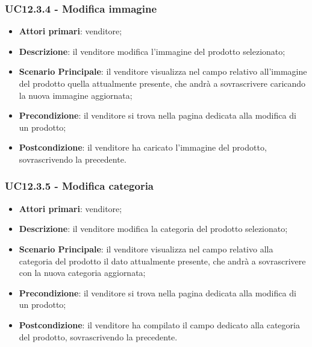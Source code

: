 \subsubsection{UC12.3.4 - Modifica immagine}
\begin{itemize}
\item \textbf{Attori primari}: venditore;
\item \textbf{Descrizione}: il venditore modifica l'immagine del prodotto selezionato;
\item \textbf{Scenario Principale}: il venditore visualizza nel campo relativo all'immagine del prodotto quella attualmente presente, che andrà a sovrascrivere caricando la nuova immagine aggiornata;
\item \textbf{Precondizione}: il venditore si trova nella pagina dedicata alla modifica di un prodotto;
\item \textbf{Postcondizione}: il venditore ha caricato l'immagine del prodotto, sovrascrivendo la precedente.
\end{itemize}

\subsubsection{UC12.3.5 - Modifica categoria}
\begin{itemize}
\item \textbf{Attori primari}: venditore;
\item \textbf{Descrizione}: il venditore modifica la categoria del prodotto selezionato;
\item \textbf{Scenario Principale}: il venditore visualizza nel campo relativo alla categoria del prodotto il dato attualmente presente, che andrà a sovrascrivere con la nuova categoria aggiornata;
\item \textbf{Precondizione}: il venditore si trova nella pagina dedicata alla modifica di un prodotto;
\item \textbf{Postcondizione}: il venditore ha compilato il campo dedicato alla categoria del prodotto, sovrascrivendo la precedente.
\end{itemize}

